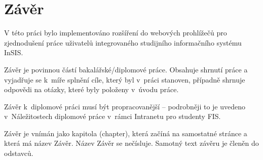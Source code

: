 \chapter*{Závěr}

V této práci bylo implementováno rozšíření do webových prohlížečů pro zjednodušení práce uživatelů integrovaného studijního informačního systému InSIS.

Závěr je povinnou částí bakalářské/diplomové práce. Obsahuje shrnutí práce a vyjadřuje se k~míře splnění cíle, který byl v~práci stanoven, případně shrnuje odpovědi na otázky, které byly položeny v~úvodu práce. 

Závěr k~diplomové práci musí být propracovanější -- podrobněji to je uvedeno v~Náležitostech diplomové práce v~rámci Intranetu pro studenty FIS.

Závěr je vnímán jako kapitola (chapter), která začíná na samostatné stránce a která má název Závěr.  Název Závěr se nečísluje. Samotný text závěru je členěn do odstavců.